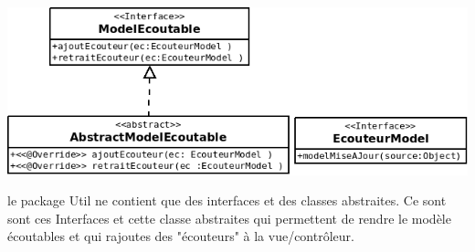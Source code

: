 \documentclass[12pt]{article}
\begin{document}
\begin{center}
\includegraphics[scale=0.3]{images/Util.png}
\end{center}


le package Util ne contient que des interfaces et des classes abstraites. Ce sont sont ces Interfaces et cette classe abstraites qui permettent de rendre le modèle écoutables et qui rajoutes des "écouteurs" à la vue/contrôleur. 
\end{document}
